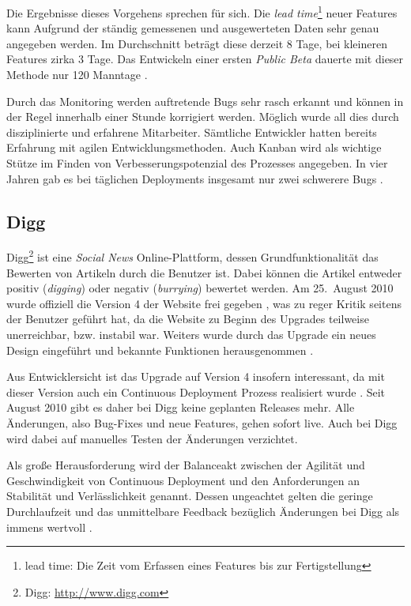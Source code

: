 Die Ergebnisse dieses Vorgehens sprechen für sich. Die \emph{lead
time}\footnote{lead time: Die Zeit vom Erfassen eines Features bis zur
Fertigstellung} neuer Features kann Aufgrund der ständig gemessenen und
ausgewerteten Daten sehr genau angegeben werden. Im Durchschnitt beträgt diese
derzeit 8 Tage, bei kleineren Features zirka 3 Tage. Das Entwickeln einer
ersten \emph{Public Beta} dauerte mit dieser Methode nur 120 Manntage
\cite{Taipale2010}.

Durch das Monitoring werden auftretende Bugs sehr rasch erkannt und können in
der Regel innerhalb einer Stunde korrigiert werden. Möglich wurde all dies
durch disziplinierte und erfahrene Mitarbeiter. Sämtliche Entwickler hatten
bereits Erfahrung mit agilen Entwicklungsmethoden. Auch Kanban wird als
wichtige Stütze im Finden von Verbesserungspotenzial des Prozesses angegeben.
In vier Jahren gab es bei täglichen Deployments insgesamt nur zwei schwerere
Bugs \cite{Taipale2010}.


\subsection{Digg}

Digg\footnote{Digg: \url{http://www.digg.com}} ist eine \emph{Social News}
Online-Plattform, dessen Grundfunktionalität das Bewerten von Artikeln durch
die Benutzer ist. Dabei können die Artikel entweder positiv (\emph{digging})
oder negativ (\emph{burrying}) bewertet werden. Am 25.~August 2010 wurde
offiziell die Version 4 der Website frei gegeben \cite{digg4-launch}, was zu
reger Kritik seitens der Benutzer geführt hat, da die Website zu Beginn des
Upgrades teilweise unerreichbar, bzw. instabil war. Weiters wurde durch das
Upgrade ein neues Design eingeführt und bekannte Funktionen herausgenommen
\cite{digg4-critics}.

Aus Entwicklersicht ist das Upgrade auf Version 4 insofern interessant, da mit
dieser Version auch ein Continuous Deployment Prozess realisiert wurde
\cite{digg4}. Seit August 2010 gibt es daher bei Digg keine geplanten Releases
mehr. Alle Änderungen, also Bug-Fixes und neue Features, gehen sofort live.
Auch bei Digg wird dabei auf manuelles Testen der Änderungen verzichtet.

Als große Herausforderung wird der Balanceakt zwischen der Agilität und
Geschwindigkeit von Continuous Deployment und den Anforderungen an Stabilität
und Verlässlichkeit genannt. Dessen ungeachtet gelten die geringe
Durchlaufzeit und das unmittelbare Feedback bezüglich Änderungen bei Digg als
immens wertvoll \cite{digg4}.

